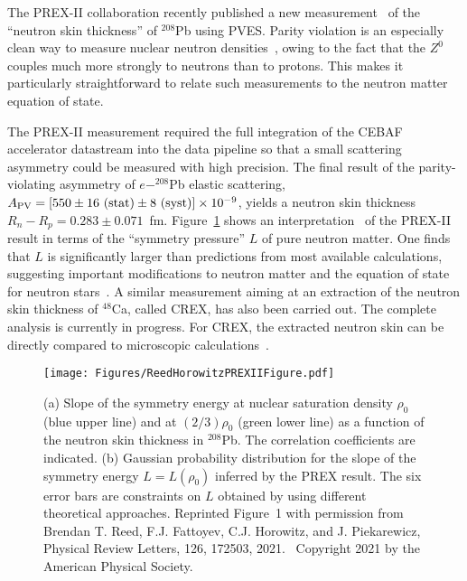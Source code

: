The PREX-II collaboration recently published a new measurement~\cite{PREX:2021umo} of the ``neutron skin thickness'' of $^{208}$Pb using PVES. Parity violation is an especially clean way to measure nuclear neutron densities~\cite{Horowitz:1999fk,Thiel:2019tkm}, owing to the fact that the $Z^0$ couples much more strongly to neutrons than to protons. This makes it particularly straightforward to relate such measurements to the neutron matter equation of state.

The PREX-II measurement required the full integration of the CEBAF accelerator datastream into the data pipeline so that a small scattering asymmetry could be measured with high precision. The final result of the parity-violating asymmetry of $e-^{208}$Pb elastic scattering, $A_{\rm PV}=[550\pm16~({\rm stat})\pm8~({\rm syst})] \times 10^{-9}$, yields a neutron skin thickness $R_n-R_p=0.283\pm0.071$~fm. Figure~\ref{fig:PREXII} shows an interpretation~\cite{Reed:2021nqk} of the PREX-II result in terms of the ``symmetry pressure'' $L$ of pure neutron matter. One finds that $L$ is significantly larger than predictions from most available calculations, suggesting important modifications to neutron matter and the equation of state for neutron stars~\cite{Horowitz:2001ya}.
%
A similar measurement aiming at an extraction of the neutron skin thickness of $^{48}$Ca, called CREX, has also been carried out. The complete analysis %
is currently in progress. For CREX, the extracted neutron skin can be directly compared to microscopic calculations~\cite{Hagen:2015yea}.

\begin{figure}
\centerline{
\texttt{[image: Figures/ReedHorowitzPREXIIFigure.pdf]}}
\caption{(a) Slope of the symmetry energy at nuclear
saturation density $\rho_0$ (blue upper line) and at $(2/3)\rho_0$ (green
lower line) as a function of the neutron skin thickness in $^{208}$Pb. The correlation coefficients are indicated. (b) Gaussian probability distribution for the slope of the symmetry energy $L=L(\rho_0)$ inferred by the PREX result. The six error bars are constraints on $L$ obtained by using different theoretical approaches.
Reprinted Figure~1 with permission from Brendan T. Reed, F.J. Fattoyev, C.J. Horowitz, and J. Piekarewicz, Physical Review Letters, 126, 172503, 2021.~\cite{Reed:2021nqk} Copyright 2021 by the American Physical Society.
\label{fig:PREXII}}
\end{figure}

